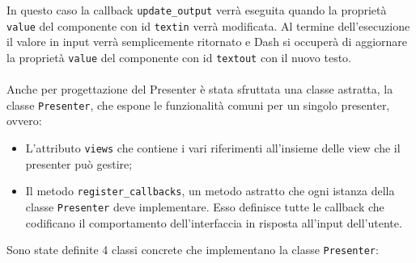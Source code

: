 In questo caso la callback \texttt{update\_output} verrà eseguita quando la proprietà \texttt{value} del componente con id \texttt{textin} verrà modificata. Al termine dell'esecuzione il valore in input verrà semplicemente ritornato e Dash si occuperà di aggiornare la proprietà \texttt{value} del componente con id \texttt{textout} con il nuovo testo.
\\ \\
Anche per progettazione del Presenter è stata sfruttata una classe astratta, la classe \texttt{Presenter}, che espone le funzionalità comuni per un singolo presenter, ovvero: 

\begin{itemize}

\item L'attributo \texttt{views} che contiene i vari riferimenti all'insieme delle view che il presenter può gestire;

\item Il metodo \texttt{register\_callbacks}, un metodo astratto che ogni istanza della classe \texttt{Presenter} deve implementare. Esso definisce tutte le callback che codificano il comportamento dell'interfaccia in risposta all'input dell'utente. 

\end{itemize}


Sono state definite 4 classi concrete che implementano la classe \texttt{Presenter}:

